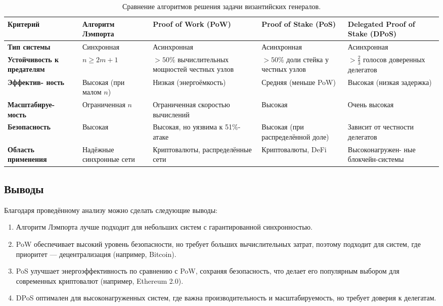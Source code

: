 \begin{table}[h!]
\centering
\begin{tabular}{|m{2.6cm}|m{3cm}|m{3cm}|m{3cm}|m{3cm}|}
\hline
\textbf{Критерий} & \textbf{Алгоритм Лэмпорта} & \textbf{Proof of Work (PoW)} & \textbf{Proof of Stake (PoS)} & \textbf{Delegated Proof of Stake (DPoS)} \\ \hline
\textbf{Тип системы} & Синхронная & Асинхронная & Асинхронная & Асинхронная \\ \hline
\textbf{Устойчивость к предателям} & \(n \geq 2m + 1\) & \(> 50\%\) вычислительных мощностей честных узлов & \(> 50\%\) доли стейка у честных узлов & \(> \frac{2}{3}\) голосов доверенных делегатов \\ \hline
\textbf{Эффектив- ность} & Высокая (при малом \(n\)) & Низкая (энергоёмкость) & Средняя (меньше PoW) & Высокая (низкая задержка) \\ \hline
\textbf{Масштабируе- мость} & Ограниченная \(n\) & Ограниченная скоростью вычислений & Высокая & Очень высокая \\ \hline
\textbf{Безопасность} & Высокая & Высокая, но уязвима к 51\%-атаке & Высокая (при распределённой доле) & Зависит от честности делегатов \\ \hline
\textbf{Область применения} & Надёжные синхронные сети & Криптовалюты, распределённые сети & Криптовалюты, DeFi & Высоконагружен- ные блокчейн-системы \\ \hline
\end{tabular}
\caption{Сравнение алгоритмов решения задачи византийских генералов.}
\label{table:compare}
\end{table}


\subsection{Выводы}

\hspace{1.25cm}
Благодаря проведённому анализу можно сделать следующие выводы:

\begin{enumerate}
    \item Алгоритм Лэмпорта лучше подходит для небольших систем с гарантированной синхронностью.
    \item PoW обеспечивает высокий уровень безопасности, но требует больших вычислительных затрат, поэтому подходит для систем, где приоритет — децентрализация (например, Bitcoin).
    \item PoS улучшает энергоэффективность по сравнению с PoW, сохраняя безопасность, что делает его популярным выбором для современных криптовалют (например, Ethereum 2.0).
    \item DPoS оптимален для высоконагруженных систем, где важна производительность и масштабируемость, но требует доверия к делегатам.
\end{enumerate}

\newpage